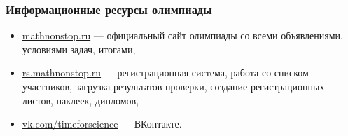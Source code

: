 \documentclass[aspectratio=1610,12pt,notheorems]{beamer}
\begin{document}
\begin{frame} \frametitle{Информационные ресурсы олимпиады}
\begin{itemize}
	\item \url{mathnonstop.ru} — официальный сайт олимпиады со всеми объявлениями, условиями задач, итогами, \medskip
	\item \url{rs.mathnonstop.ru} — регистрационная система, работа со списком участников, загрузка результатов проверки, создание регистрационных листов, наклеек, дипломов, \medskip
	\item \url{vk.com/timeforscience} — ВКонтакте.\medskip
\end{itemize}
\end{frame}
\end{document}
